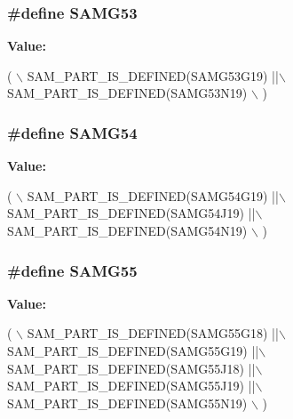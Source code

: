 \subsubsection[{S\+A\+M\+G53}]{\setlength{\rightskip}{0pt plus 5cm}\#define S\+A\+M\+G53}\label{group__sam__part__macros__group_gaee5167c2eae38c830d175d48769391d8}
{\bfseries Value\+:}
\begin{DoxyCode}
( \(\backslash\)
        SAM\_PART\_IS\_DEFINED(SAMG53G19) ||\(\backslash\)
        SAM\_PART\_IS\_DEFINED(SAMG53N19) \(\backslash\)
        )
\end{DoxyCode}
\hypertarget{group__sam__part__macros__group_ga0cd510d1aac0c983cf19398f7dd2b6a1}{}
\subsubsection[{S\+A\+M\+G54}]{\setlength{\rightskip}{0pt plus 5cm}\#define S\+A\+M\+G54}\label{group__sam__part__macros__group_ga0cd510d1aac0c983cf19398f7dd2b6a1}
{\bfseries Value\+:}
\begin{DoxyCode}
( \(\backslash\)
        SAM\_PART\_IS\_DEFINED(SAMG54G19) ||\(\backslash\)
        SAM\_PART\_IS\_DEFINED(SAMG54J19) ||\(\backslash\)
        SAM\_PART\_IS\_DEFINED(SAMG54N19) \(\backslash\)
        )
\end{DoxyCode}
\hypertarget{group__sam__part__macros__group_ga80c14f26d62169592dd858e259b440de}{}
\subsubsection[{S\+A\+M\+G55}]{\setlength{\rightskip}{0pt plus 5cm}\#define S\+A\+M\+G55}\label{group__sam__part__macros__group_ga80c14f26d62169592dd858e259b440de}
{\bfseries Value\+:}
\begin{DoxyCode}
( \(\backslash\)
        SAM\_PART\_IS\_DEFINED(SAMG55G18) ||\(\backslash\)
        SAM\_PART\_IS\_DEFINED(SAMG55G19) ||\(\backslash\)
        SAM\_PART\_IS\_DEFINED(SAMG55J18) ||\(\backslash\)
        SAM\_PART\_IS\_DEFINED(SAMG55J19) ||\(\backslash\)
        SAM\_PART\_IS\_DEFINED(SAMG55N19) \(\backslash\)
        )
\end{DoxyCode}
\hypertarget{group__sam__part__macros__group_ga801950238d1ae14ecc1f1b41ebc6e392}{}
